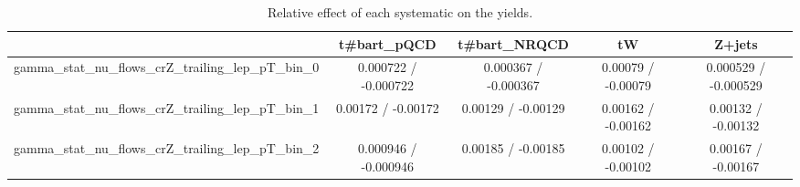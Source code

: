 \documentclass[10pt]{article}
\begin{document}
\begin{table}[htbp]
\begin{center}
\begin{tabular}{|c|c|c|c|c|}
\hline 
      & t#bar{t}_{pQCD}      & t#bar{t}_{NRQCD}      & tW      & Z+jets \\ 
\hline 
  gamma_stat_nu_flows_crZ_trailing_lep_pT_bin_0 & 0.000722 / -0.000722 & 0.000367 / -0.000367 & 0.00079 / -0.00079 & 0.000529 / -0.000529 \\ 
  gamma_stat_nu_flows_crZ_trailing_lep_pT_bin_1 & 0.00172 / -0.00172 & 0.00129 / -0.00129 & 0.00162 / -0.00162 & 0.00132 / -0.00132 \\ 
  gamma_stat_nu_flows_crZ_trailing_lep_pT_bin_2 & 0.000946 / -0.000946 & 0.00185 / -0.00185 & 0.00102 / -0.00102 & 0.00167 / -0.00167 \\ 
\hline 
\end{tabular} 
\caption{Relative effect of each systematic on the yields.} 
\end{center} 
\end{table} 
\end{document}
